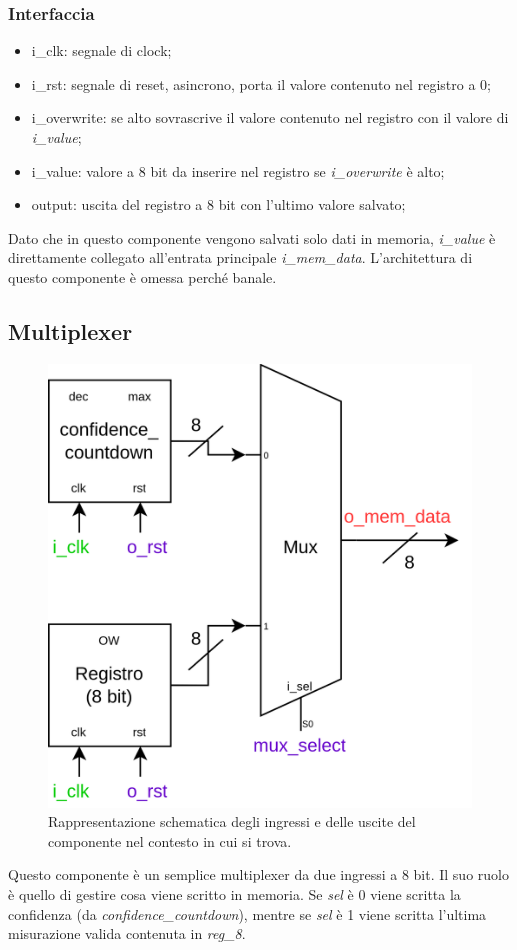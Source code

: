 \documentclass[12pt,a4paper]{scrartcl}
\begin{document}
    \subsubsection{Interfaccia}
    \begin{itemize}
        \item i\_clk: segnale di clock;
        \item i\_rst: segnale di reset, asincrono, porta il valore contenuto nel registro a 0;
        \item i\_overwrite: se alto sovrascrive il valore contenuto nel registro con il valore di \textit{i\_value};
        \item i\_value: valore a 8 bit da inserire nel registro se \textit{i\_overwrite} è alto;
        \item output: uscita del registro a 8 bit con l'ultimo valore salvato;
    \end{itemize}
    Dato che in questo componente vengono salvati solo dati in memoria, \textit{i\_value} è direttamente collegato all'entrata principale \textit{i\_mem\_data}.
    L'architettura di questo componente è omessa perché banale.
    \newpage
    \subsection{Multiplexer}
        \begin{figure}[htbp]
          \centering
          \includegraphics[width=0.4\linewidth]{schema-mux.drawio.png}
          \caption{Rappresentazione schematica degli ingressi e delle uscite del componente nel contesto in cui si trova.}
          \label{fig:componente}
        \end{figure}
     Questo componente è un semplice multiplexer da due ingressi a 8 bit. Il suo ruolo è quello di gestire cosa viene scritto in memoria.
     Se \textit{sel} è 0 viene scritta la confidenza (da \textit{confidence\_countdown}), mentre se \textit{sel} è 1 viene scritta l'ultima misurazione valida contenuta in \textit{reg\_8}.
\end{document}
